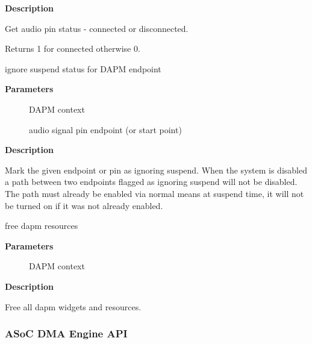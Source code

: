 \documentclass[a4paper,8pt,english]{sphinxmanual}
\begin{document}
\textbf{Description}

Get audio pin status - connected or disconnected.

Returns 1 for connected otherwise 0.

\begin{fulllineitems}
\label{sound/kernel-api/alsa-driver-api:c.snd_soc_dapm_ignore_suspend}
ignore suspend status for DAPM endpoint

\end{fulllineitems}


\textbf{Parameters}
\begin{description}
\item[{}] \leavevmode
DAPM context

\item[{}] \leavevmode
audio signal pin endpoint (or start point)

\end{description}

\textbf{Description}

Mark the given endpoint or pin as ignoring suspend.  When the
system is disabled a path between two endpoints flagged as ignoring
suspend will not be disabled.  The path must already be enabled via
normal means at suspend time, it will not be turned on if it was not
already enabled.

\begin{fulllineitems}
\label{sound/kernel-api/alsa-driver-api:c.snd_soc_dapm_free}
free dapm resources

\end{fulllineitems}


\textbf{Parameters}
\begin{description}
\item[{}] \leavevmode
DAPM context

\end{description}

\textbf{Description}

Free all dapm widgets and resources.


\subsubsection{ASoC DMA Engine API}
\label{sound/kernel-api/alsa-driver-api:asoc-dma-engine-api}
\end{document}
